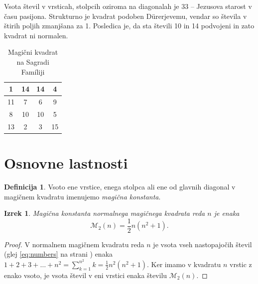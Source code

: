 \documentclass[a4paper,12pt]{article}
\newcommand{\m}{\mathcal{M}_2}
\newcommand{\pojem}[1]{\emph{\color{purple}#1}}
\theoremstyle{definition}
\newtheorem{definicija}{Definicija}
\theoremstyle{plain}
\newtheorem{izrek}{Izrek}
\newenvironment{dokaz}
   {\begin{proof}}
   {\end{proof}}
\newenvironment{magic}[3]
   {\begin{table}[!ht]
      \centering
      \caption{#2}
      \label{#3}
      \begin{tabular}{|*{#1}{c|}}
   }
   {\end{tabular}
      \end{table}}
\begin{document}
Vsota števil v vrsticah, stolpcih oziroma na diagonalah je 33 -- Jezusova starost
v času pasijona. Strukturno je kvadrat podoben Dürerjevemu, vendar so števila
v štirih poljih zmanjšana za 1. Posledica je, da sta števili 10 in 14 podvojeni
in zato kvadrat ni normalen.
%
\begin{magic}{4}{Magični kvadrat na Sagradi Famíliji}{table:sagrada}
   \hline
   1 & 14 & 14 & 4 \\ \hline
   11 & 7 & 6 & 9 \\ \hline
   8 & 10 & 10 & 5 \\ \hline
   13 & 2 & 3 & 15\\ \hline
\end{magic}

\section{Osnovne lastnosti}

\begin{definicija}
   Vsoto ene vrstice, enega stolpca ali ene od glavnih diagonal
   v magičnem kvadratu imenujemo \pojem{magična konstanta}.
\end{definicija}

\begin{izrek}
   Magična konstanta normalnega magičnega kvadrata reda \(n\)
   je enaka
   \begin{equation}
      \label{eq:mc}
      \m(n) = \frac{1}{2} n(n^2+1).
   \end{equation}
\end{izrek}

\begin{dokaz}
   V normalnem magičnem kvadratu reda \(n\) je vsota vseh nastopajočih
   števil (glej \eqref{eq:numbers} na strani \pageref{eq:numbers}) enaka
   \(1+2+3+\ldots+n^2=\sum_{k=1}^{n^2}k=\frac{1}{2}n^2(n^2+1)\). Ker imamo
   v kvadratu \(n\) vrstic z enako vsoto, je vsota števil v eni vrstici
   enaka številu \(\m(n)\).
\end{dokaz}
\end{document}
